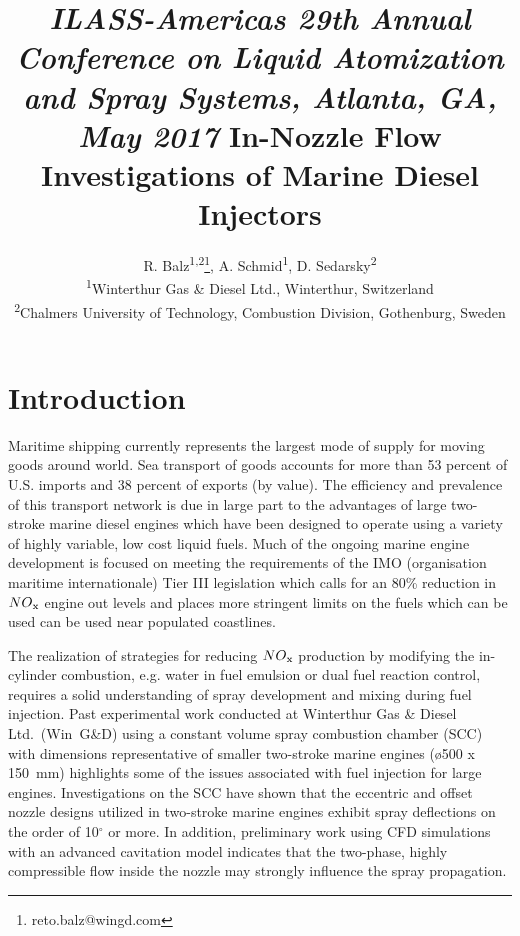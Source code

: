 \documentclass[letterpaper,twocolumn,10pt]{ilass}
\title{\vspace{-0.25in}
      {\small \em
       ILASS-Americas 29th Annual Conference on Liquid Atomization and Spray Systems,
       Atlanta, GA, May 2017} \newline\newline
      {\large\bf In-Nozzle Flow Investigations of Marine Diesel Injectors} }
\author{\large
        R. Balz\textsuperscript{1,2}\footnote{reto.balz@wingd.com},
				A. Schmid\textsuperscript{1},
				D. Sedarsky\textsuperscript{2}\\
				\textsuperscript{1}Winterthur Gas \& Diesel Ltd.,
				Winterthur,	Switzerland\\
				\textsuperscript{2}Chalmers University of Technology,
				Combustion Division, Gothenburg, Sweden}
\date{\normalsize  \centerline{\bf Abstract} \vspace{0.05in}
\begin{minipage}{6.5in} \normalsize
Injector geometries of large marine two-stroke diesel engines differ extensively from
configurations typically used in diesel engines for automotive applications.
In marine engines, the fuel enters the combustion volume radially, supplied by a
multi-hole injector with asymmetrically positioned orifices facing in similar directions
(shallow umbrella angle). Due to this setup, the nominal direction of the orifice group
is also eccentric with respect to the central axis of the injector.
%
Experiments have shown that the sprays formed by this arrangement are asymmetric
with respect to the axis at each orifice. These strong deviations can lead
to wall wetting which increases fuel consumption, emissions, component temperatures and
contributes to loss of lubrication at the wall.
In order to investigate the in-nozzle flow and how it affects the spray morphology in this
design, experiments were carried out using transparent nozzles at injection pressures and
air densities of up to 80~MPa and 35~kg/m$^3$, respectively.
The experiments were performed with diesel fuel in a newly built ambient temperature
spray chamber which was designed to cope with significant spray backsplash.
The results discussed here were generated using an orthogonally arranged 0.75~mm diameter
mono-hole injector which matches the hole size and geometry used in large marine two-stroke
diesel engines.
%
High-speed shadowgraphy using a far-field microscope was applied to visualize cavitation
within the nozzle during the complete injection process. These imaging results are use to
compute statistical evaluations of cavitation in the nozzle over a range of conditions.
\end{minipage} \vspace{-0.25in}}
\begin{document}
\ifpdf
{}
\else
{}
\fi

\maketitle

\clearpage

\setcounter{page}{2}


\section*{Introduction}
Maritime shipping currently represents the largest mode of supply for moving goods around
world. Sea transport of goods accounts for more than 53 percent of U.S. imports and 38 percent
of exports (by value)\cite{Blank2012}. The efficiency and prevalence of this transport network
is due in large part to the advantages of large two-stroke marine diesel engines which have
been designed to operate using a variety of highly variable, low cost liquid fuels. 
%
Much of the ongoing marine engine development is focused on meeting the requirements of the
IMO (organisation maritime internationale) Tier III legislation which calls for an 80\%
reduction in $NO\textsubscript{x}$ engine out levels and places more stringent limits on
the fuels which can be used can be used near populated coastlines.

The realization of strategies for reducing $NO\textsubscript{x}$ production by
modifying the in-cylinder combustion, e.g. water in fuel emulsion or dual fuel reaction control,
requires a solid understanding of spray development and mixing during fuel injection.
%
Past experimental work conducted at Winterthur Gas \& Diesel Ltd.~(Win~G\&D) using a
constant volume spray combustion chamber (SCC) with dimensions representative of
smaller two-stroke marine engines (\o 500 x 150~mm) highlights some of the issues
associated with fuel injection for large engines\cite{Herrmann2011}.
Investigations on the SCC have shown that the eccentric and offset nozzle designs utilized
in two-stroke marine engines exhibit spray deflections on the order of
10$^{\circ}$ or more\cite{Schmid2013}.
%
In addition, preliminary work using CFD simulations with an advanced cavitation model
indicates that the two-phase, highly compressible flow inside the nozzle may strongly
influence the spray propagation\cite{Schmid2014}.
%
\end{document}
